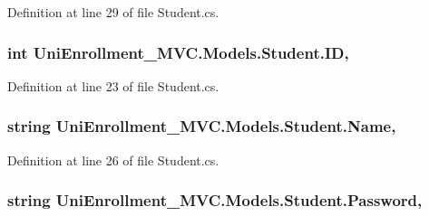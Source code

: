 Definition at line 29 of file Student.\+cs.

\subsubsection[{\texorpdfstring{ID}{ID}}]{\setlength{\rightskip}{0pt plus 5cm}int Uni\+Enrollment\+\_\+\+M\+V\+C.\+Models.\+Student.\+ID\hspace{0.3cm}{\ttfamily [get]}, {\ttfamily [set]}}\hypertarget{class_uni_enrollment___m_v_c_1_1_models_1_1_student_af90e9ea91812385aeacb0d8016a6ac4d}{}\label{class_uni_enrollment___m_v_c_1_1_models_1_1_student_af90e9ea91812385aeacb0d8016a6ac4d}


Definition at line 23 of file Student.\+cs.

\subsubsection[{\texorpdfstring{Name}{Name}}]{\setlength{\rightskip}{0pt plus 5cm}string Uni\+Enrollment\+\_\+\+M\+V\+C.\+Models.\+Student.\+Name\hspace{0.3cm}{\ttfamily [get]}, {\ttfamily [set]}}\hypertarget{class_uni_enrollment___m_v_c_1_1_models_1_1_student_ab45cd7a456ecc65eb17b5b72f8b117d4}{}\label{class_uni_enrollment___m_v_c_1_1_models_1_1_student_ab45cd7a456ecc65eb17b5b72f8b117d4}


Definition at line 26 of file Student.\+cs.

\subsubsection[{\texorpdfstring{Password}{Password}}]{\setlength{\rightskip}{0pt plus 5cm}string Uni\+Enrollment\+\_\+\+M\+V\+C.\+Models.\+Student.\+Password\hspace{0.3cm}{\ttfamily [get]}, {\ttfamily [set]}}\hypertarget{class_uni_enrollment___m_v_c_1_1_models_1_1_student_ad31ea99bde5adc6008eb13d8e897cdab}{}\label{class_uni_enrollment___m_v_c_1_1_models_1_1_student_ad31ea99bde5adc6008eb13d8e897cdab}


